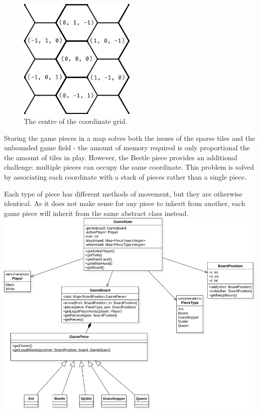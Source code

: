 \documentclass[
]{article}
\begin{document}
\begin{figure}
\centering
\includegraphics[width=0.5\textwidth,height=\textheight]{images/coords.png}
\caption{The centre of the coordinate grid.}
\end{figure}

Storing the game pieces in a map solves both the issues of the sparse
tiles and the unbounded game field - the amount of memory required is
only proportional the the amount of tiles in play. However, the Beetle
piece provides an additional challenge: multiple pieces can occupy the
same coordinate. This problem is solved by associating each coordinate
with a stack of pieces rather than a single piece.

Each type of piece has different methods of movement, but they are
otherwise identical. As it does not make sense for any piece to inherit
from another, each game piece will inherit from the same abstract class
instead.
\includegraphics[width=1\textwidth,height=\textheight]{images/class-diag.png}
\end{document}
